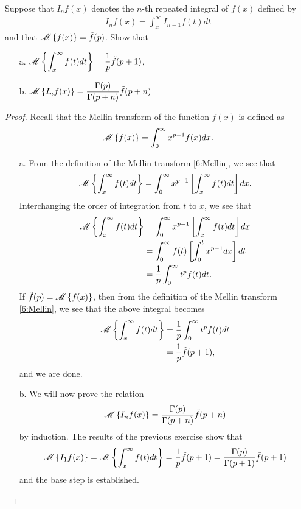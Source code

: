 \begin{problem}{6}
  Suppose that $I_n f(x)$ denotes the $n$-th repeated integral of $f(x)$ defined by
  \begin{align*}
    I_n f(x) = \int_x^\infty I_{n-1}f(t) dt
  \end{align*}
  and that $\mathscr{M}\left\{ {f(x)} \right\} = \tilde{f}(p)$. Show that
  \begin{enumerate}
    \item[a.] $\displaystyle \mathscr{M}\left\{ {\int_x^\infty f(t) dt} \right\} = \frac{1}{p}\tilde{f}(p+1)$,
    \item[b.] $\displaystyle \mathscr{M}\left\{ {I_n f(x)} \right\} = \frac{\Gamma(p)}{\Gamma(p+n)} \tilde{f}(p + n)$
  \end{enumerate}
\end{problem}

\begin{proof}
  Recall that the Mellin transform of the function $f(x)$ is defined as
  \begin{align}
    \label{6:Mellin}
    \mathscr{M}\left\{ {f(x)} \right\} = \int_0^\infty x^{p-1} f(x) dx.
  \end{align}

  \begin{enumerate}
    \item[a.] From the definition of the Mellin transform \eqref{6:Mellin}, we see that
      \begin{align*}
        \mathscr{M}\left\{ {\int_x^\infty f(t) dt} \right\}  = \int_0^\infty x^{p-1} \left[\int_x^\infty f(t) dt\right] dx.
      \end{align*}
      Interchanging the order of integration from $t$ to $x$, we see that
      \begin{align*}
        \mathscr{M}\left\{ {\int_x^\infty f(t) dt} \right\}  &= \int_0^\infty x^{p-1} \left[\int_x^\infty f(t) dt\right] dx \\
        &= \int_0^\infty f(t) \left[\int_0^t x^{p-1} dx\right] dt \\
        &= \frac{1}{p}\int_0^\infty t^{p}f(t)dt.
      \end{align*}
      If $\tilde{f}(p) = \mathscr{M}\left\{ {f(x)} \right\}$, then from the definition of the Mellin transform \eqref{6:Mellin},
      we see that the above integral becomes
      \begin{align*}
        \mathscr{M}\left\{ {\int_x^\infty f(t) dt} \right\}
        &= \frac{1}{p}\int_0^\infty t^{p}f(t)dt \\
        &= \frac{1}{p}\tilde{f}(p+1),
      \end{align*}
      and we are done.

    \item[b.] We will now prove the relation
      \begin{align*}
        \mathscr{M}\left\{ {I_n f(x)} \right\} = \frac{\Gamma(p)}{\Gamma(p+n)} \tilde{f}(p + n)
      \end{align*}
      by induction. The results of the previous exercise show that
      \begin{align*}
        \mathscr{M}\left\{ {I_1 f(x)} \right\}
        = \mathscr{M}\left\{ {\int_x^\infty f(t) dt} \right\}
        = \frac{1}{p}\tilde{f}(p+1)
        = \frac{\Gamma(p)}{\Gamma(p+1)}\tilde{f}(p+1)
      \end{align*}
      and the base step is established.


\end{enumerate}
\end{proof}
